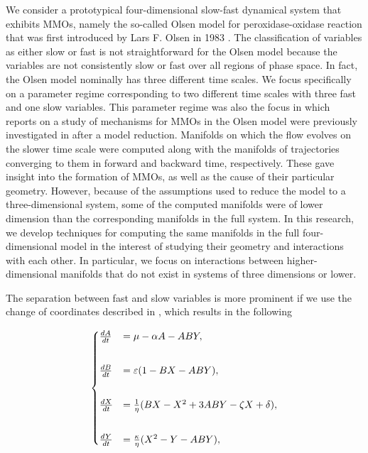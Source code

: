 \documentclass{ws-ijbc}
\begin{document}
We consider a prototypical four-dimensional slow-fast dynamical system that exhibits MMOs, namely the so-called Olsen model for peroxidase-oxidase reaction that was first introduced by Lars F. Olsen in 1983  \cite{Olsen}.  The classification of variables as either slow or fast is not straightforward for the Olsen model because the variables are not consistently slow or fast over all regions of phase space.  In fact, the Olsen model nominally has three different time scales.  We focus specifically on a parameter regime corresponding to two different time scales with three fast and one slow variables.  This parameter regime was also the focus in \cite{QSSA} which reports on a study of mechanisms for MMOs in the Olsen model were previously investigated in \cite{QSSA} after a model reduction.  Manifolds on which the flow evolves on the slower time scale were computed along with the manifolds of trajectories converging to them in forward and backward time, respectively.  These gave insight into the formation of MMOs, as well as the cause of their particular geometry.  However, because of the assumptions used to reduce the model to a three-dimensional system, some of the computed manifolds were of lower dimension than the corresponding manifolds in the full system.  In this research, we develop techniques for computing the same manifolds in the full four-dimensional model in the interest of studying their geometry and interactions with each other.  In particular, we focus on interactions between higher-dimensional manifolds that do not exist in systems of three dimensions or lower.


The separation between fast and slow variables is more prominent if we use the change of coordinates described in \cite{Rescaling}, which results in the following
    
\begin{equation}
\begin{aligned}
\begin{cases}
\frac{dA}{dt} &= \mu - \alpha A - ABY, \\ \vspace{2mm}\\
\frac{dB}{dt} &= \varepsilon(1-BX - ABY), \\ \vspace{2mm}\\
\frac{dX}{dt} &= \frac{1}{\eta}(BX - X^2 +3ABY - \zeta X + \delta), \\ \vspace{2mm}\\
\frac{dY}{dt} &= \frac{\kappa}{\eta}(X^2 - Y - ABY),
\end{cases}
\end{aligned}
\label{equation_1}
\end{equation}
    
\end{document}
